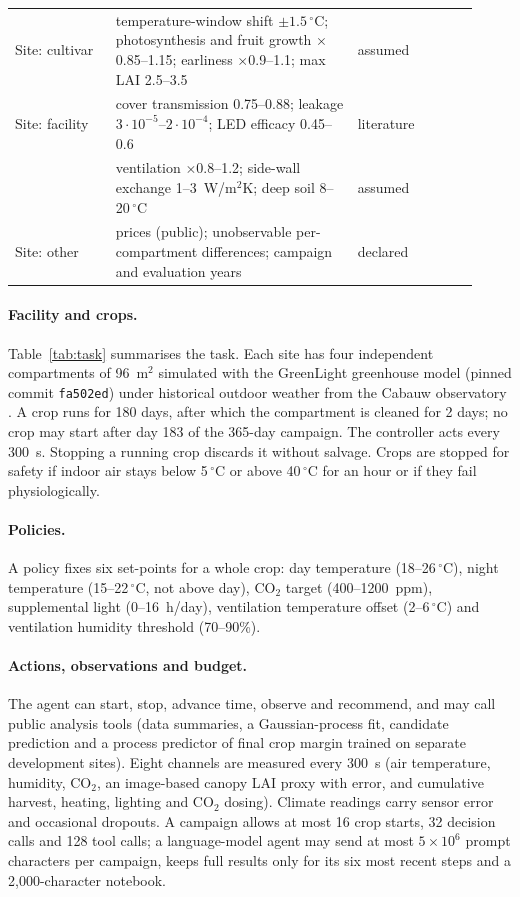 \begin{table}[t]
\begin{tabular}{@{}p{0.2\linewidth}p{0.48\linewidth}p{0.24\linewidth}@{}}
Site: cultivar & temperature-window shift $\pm1.5$\,$^\circ$C; photosynthesis and fruit growth $\times$0.85--1.15; earliness $\times$0.9--1.1; max LAI 2.5--3.5 & assumed \\
Site: facility & cover transmission 0.75--0.88; leakage $3\cdot10^{-5}$--$2\cdot10^{-4}$; LED efficacy 0.45--0.6 & literature \\
 & ventilation $\times$0.8--1.2; side-wall exchange 1--3~W/m$^2$K; deep soil 8--20\,$^\circ$C & assumed \\
Site: other & prices (public); unobservable per-compartment differences; campaign and evaluation years & declared \\
\bottomrule
\end{tabular}
\end{table}
\paragraph{Facility and crops.} Table~\ref{tab:task} summarises the task. Each site has four independent compartments of 96~m$^2$ simulated with the GreenLight greenhouse model \citep{katzin2020greenlight} (pinned commit \texttt{fa502ed}) under historical outdoor weather from the Cabauw observatory \citep{knmi_cabauw,knmi_cabauw_rad}. A crop runs for 180 days, after which the compartment is cleaned for 2 days; no crop may start after day 183 of the 365-day campaign. The controller acts every 300~s. Stopping a running crop discards it without salvage. Crops are stopped for safety if indoor air stays below 5\,$^\circ$C or above 40\,$^\circ$C for an hour or if they fail physiologically.

\paragraph{Policies.} A policy fixes six set-points for a whole crop: day temperature (18--26\,$^\circ$C), night temperature (15--22\,$^\circ$C, not above day), CO$_2$ target (400--1200~ppm), supplemental light (0--16~h/day), ventilation temperature offset (2--6\,$^\circ$C) and ventilation humidity threshold (70--90\%).

\paragraph{Actions, observations and budget.} The agent can start, stop, advance time, observe and recommend, and may call public analysis tools (data summaries, a Gaussian-process fit, candidate prediction and a process predictor of final crop margin trained on separate development sites). Eight channels are measured every 300~s (air temperature, humidity, CO$_2$, an image-based canopy LAI proxy with error, and cumulative harvest, heating, lighting and CO$_2$ dosing). Climate readings carry sensor error and occasional dropouts. A campaign allows at most 16 crop starts, 32 decision calls and 128 tool calls; a language-model agent may send at most $5\times10^6$ prompt characters per campaign, keeps full results only for its six most recent steps and a 2{,}000-character notebook.

